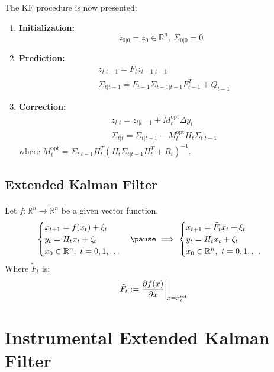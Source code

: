 \documentclass{beamer}
\theoremstyle{definition}
\theoremstyle{remark}
\theoremstyle{example}
\newif\ifinsection
\newif\ifinsubsection
\let\oldsection\section
\renewcommand{\section}{%
  \global\insectiontrue%
  \global\insubsectionfalse%
  \oldsection}
\let\oldsubsection\subsection
\renewcommand{\subsection}{%
  \global\insubsectiontrue%
  \oldsubsection}
\newcommand {\aframe}[1] {%
  \begin{frame}
    \ifinsection\frametitle{\secname}\fi
    \ifinsubsection\framesubtitle{\subsecname}\fi
  #1
  \end{frame}
}
\begin{document}
\aframe{
The KF procedure is now presented:
\begin{enumerate}
  \item \textbf{Initialization: }
  \[
  z_{0|0}=z_0\in \mathbb{R}^n, \ \Sigma_{0|0}=0
  \]
  \item \textbf{Prediction: }
  \[
  \begin{split}
    &z_{t|t-1}=F_tz_{t-1|t-1}\\
    &\Sigma_{t|t-1}=F_{t-1}\Sigma_{t-1|t-1}F_{t-1}^T+Q_{t-1}
  \end{split}
  \]
  \item \textbf{Correction: }
  \[
  \begin{split}
    &z_{t | t}=z_{t | t-1}+M_{t}^{\text{opt}} \Delta y_{t} \\
    &\Sigma_{t | t}=\Sigma_{t | t-1}-M_{t}^{\text{opt}} H_{t} \Sigma_{t | t-1}
  \end{split}
  \]
  where ${M_{t}^{\text {opt}}=\Sigma_{t | t-1} H_{t}^{T}\left(H_{t} \Sigma_{t | t-1} H_{t}^{T}+R_{t}\right)^{-1}}$.
\end{enumerate}
}

\subsection{Extended Kalman Filter}
\aframe{
  Let $f:\mathbb{R}^n \rightarrow \mathbb{R}^n$ be a given vector function.
\begin{equation}
  \begin{cases}
    x_{t+1}=f(x_t) + \xi_t&\\
    y_t=H_tx_t+\zeta_t&\\
    x_0\in \mathbb{R}^n, \ t=0,1,\ldots &
  \end{cases}
  \pause \implies
  \begin{cases}
    x_{t+1}=\tilde{F}_tx_t + \xi_t&\\
    y_t=H_tx_t+\zeta_t &\\
    x_0\in \mathbb{R}^n, \ t=0,1,\ldots &
  \end{cases}
\end{equation}
Where $\tilde{F}_t$ is:
\[
\tilde{F}_t:=\dfrac{\partial f(x)}{\partial x}\bigg|_{x=x^{{\rm ref}}_t}
\]
}

\section{Instrumental Extended Kalman Filter}
\end{document}

